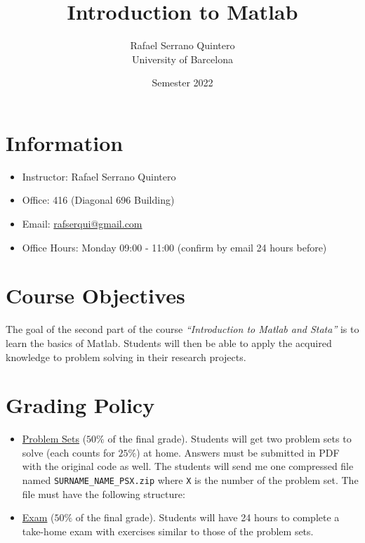 \documentclass[a4paper,12pt]{article}
\begin{document}

\title{\textbf{Introduction to Matlab}}
\author{Rafael Serrano Quintero \\
University of Barcelona}
\date{ Semester 2022}

\maketitle

\section{Information}

\begin{itemize}
    \item Instructor: Rafael Serrano Quintero
    \item Office: 416 (Diagonal 696 Building)
    \item Email: \href{mailto:rafserqui@gmail.com}{rafserqui@gmail.com}
    \item Office Hours: Monday 09:00 - 11:00 (confirm by email 24 hours before)
\end{itemize}

\section{Course Objectives}

The goal of the second part of the course \textit{``Introduction to Matlab and Stata''} is to learn the basics of Matlab. Students will then be able to apply the acquired knowledge to problem solving in their research projects.

\section{Grading Policy}

\begin{itemize}
    \item \underline{Problem Sets} ($50\%$ of the final grade).
    Students will get two problem sets to solve (each counts for $25\%$) at home. Answers must be submitted in PDF with the original code as well. The students will send me one compressed file named \verb+SURNAME_NAME_PSX.zip+ where \verb+X+ is the number of the problem set. The file must have the following structure:
    
    \begin{minipage}[c]{0.8\textwidth}
    \end{minipage}
    \item \underline{Exam} ($50\%$ of the final grade). Students will have 24 hours to complete a take-home exam with exercises similar to those of the problem sets.
\end{itemize}
\end{document}
